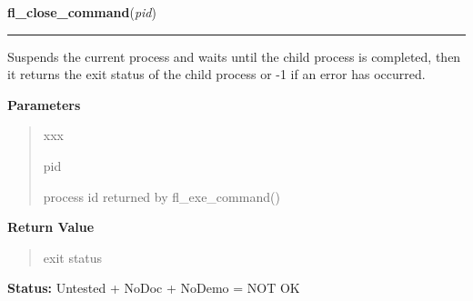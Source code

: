 \hspace{.8\funcindent}\begin{boxedminipage}{\funcwidth}

    \raggedright \textbf{fl\_close\_command}(\textit{pid})

    \vspace{-1.5ex}

    \rule{\textwidth}{0.5\fboxrule}
\setlength{\parskip}{2ex}
    Suspends the current process and waits until the child process is 
    completed, then it returns the exit status of the child process or -1 
    if an error has occurred.

\setlength{\parskip}{1ex}
      \textbf{Parameters}
      \vspace{-1ex}

      \begin{quote}
        \begin{Ventry}{xxx}

          \item[pid]

          process id returned by fl\_exe\_command()

        \end{Ventry}

      \end{quote}

      \textbf{Return Value}
    \vspace{-1ex}

      \begin{quote}
      exit status

      \end{quote}

\textbf{Status:} Untested + NoDoc + NoDemo = NOT OK



    \end{boxedminipage}

    \label{xformslib:library:fl_check_command}

    \vspace{0.5ex}

